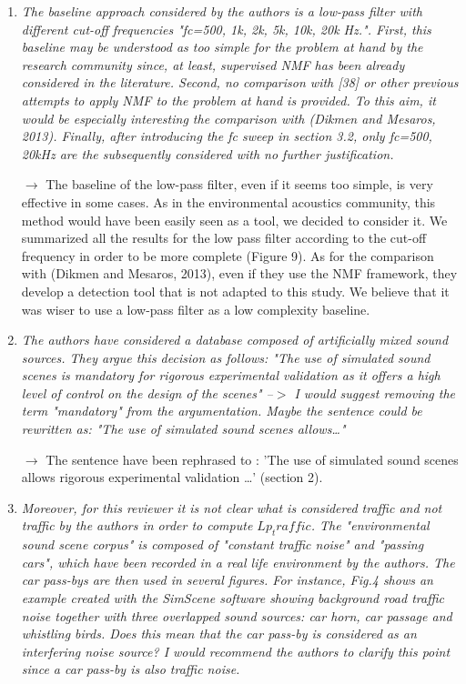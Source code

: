 \documentclass[10pt]{article}
\begin{document}
\begin{enumerate}
\item \emph{The baseline approach considered by the authors is a low-pass filter with different cut-off frequencies "fc={500, 1k, 2k, 5k, 10k, 20k} Hz.". First, this baseline may be understood as too simple for the problem at hand by the research community since, at least, supervised NMF has been already considered in the literature. Second, no comparison with [38] or other previous attempts to apply NMF to the problem at hand is provided. To this aim, it would be especially interesting the comparison with (Dikmen and Mesaros, 2013). Finally, after introducing the fc sweep in section 3.2, only fc={500, 20k}Hz are the subsequently considered with no further justification.}

$\rightarrow$ The baseline of the low-pass filter, even if it seems too simple, is very effective in some cases. As in the environmental acoustics community, this method would have been easily seen as a tool, we decided to consider it. We summarized all the results for the low pass filter according to the cut-off frequency in order to be more complete (Figure 9).
As for the comparison with (Dikmen and Mesaros, 2013), even if they use the NMF framework, they develop a detection tool that is not adapted to this study. We believe that it was wiser to use a low-pass filter as a low complexity baseline.

\item \emph{The authors have considered a database composed of artificially mixed sound sources. They argue this decision as follows: "The use of simulated sound scenes is mandatory for rigorous experimental validation as it offers a high level of control on the design of the scenes" --$>$ I would suggest removing the term "mandatory" from the argumentation. Maybe the sentence could be rewritten as: "The use of simulated sound scenes allows…" }

$\rightarrow$ The sentence have been rephrased to : 'The use of simulated sound scenes allows rigorous experimental validation \dots' (section 2).


\item \emph{Moreover, for this reviewer it is not clear what is considered traffic and not traffic by the authors in order to compute $Lp_traffic$. The "environmental sound scene corpus" is composed of "constant traffic noise" and "passing cars", which have been recorded in a real life environment by the authors. The car pass-bys are then used in several figures. For instance, Fig.4 shows an example created with the SimScene software showing background road traffic noise together with three overlapped sound sources: car horn, car passage and whistling birds. Does this mean that the car pass-by is considered as an interfering noise source? I would recommend the authors to clarify this point since a car pass-by is also traffic noise.}


\end{enumerate}
\end{document}

